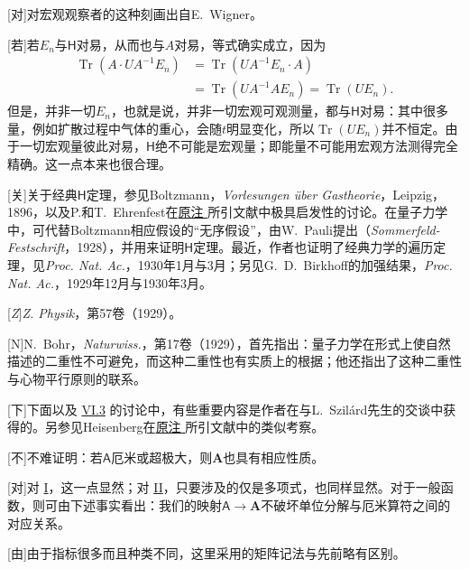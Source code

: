 \documentclass[fontsize=13pt,twoside,openany,headings=normal,parskip=false,bookmarkpackage=false,DIV=calc]{scrbook}
\begin{document}
[对]{对宏观观察者的这种刻画出自E.~Wigner。}

[若]{若$E_n$与$\mathsf H$对易，从而也与$A$对易，等式确实成立，因为
\begin{align*}
\operatorname{Tr}(A\cdot UA^{-1}E_n)
&=\operatorname{Tr}(UA^{-1}E_n\cdot A)\\
&=\operatorname{Tr}(UA^{-1}AE_n)=\operatorname{Tr}(UE_n).
\end{align*}
但是，并非一切$E_n$，也就是说，并非一切宏观可观测量，\hypertarget{origpage-262}{}\label{origpage-262}都与$\mathsf H$对易：其中很多量，例如扩散过程中气体的重心，会随$t$明显变化，所以$\operatorname{Tr}(UE_n)$并不恒定。由于一切宏观量彼此对易，$\mathsf H$绝不可能是宏观量；即能量不可能用宏观方法测得完全精确。这一点本来也很合理。}

[关]{关于经典$\mathsf H$定理，参见Boltzmann，\emph{Vorlesungen über Gastheorie}，Leipzig，1896，以及P.和T.~Ehrenfest在\CJKglue \hyperlink{note-185}{原注 } 所引文献中极具启发性的讨论。在量子力学中，可代替Boltzmann相应假设的“无序假设”，由W.~Pauli提出（\emph{Sommerfeld-Festschrift}，1928），并用来证明$\mathsf H$定理。最近，作者也证明了经典力学的遍历定理，见\emph{Proc. Nat. Ac.}，1930年1月与3月；另见G.~D.~Birkhoff的加强结果，\emph{Proc. Nat. Ac.}，1929年12月与1930年3月。}

[\emph{Z}]{\emph{Z. Physik}，第57卷（1929）。}

[N]{N.~Bohr，\emph{Naturwiss.}，第17卷（1929），首先指出：量子力学在形式上使自然描述的二重性不可避免，而这种二重性也有实质上的根据；他还指出了这种二重性与心物平行原则的联系。}

[下]{下面以及 \hyperref[sec:VI.3]{VI.3} 的讨论中，有些重要内容是作者在与L.~Szilárd先生的交谈中获得的。另参见Heisenberg在\CJKglue \hyperlink{note-181}{原注 } 所引文献中的类似考察。}

[不]{不难证明：若$\mathsf A$厄米或超极大，则$\boldsymbol A$也具有相应性质。}

[对]{对 \hyperref[cond:IV.2.I]{I}，这一点显然；对 \hyperref[cond:IV.2.II]{II}，只要涉及的仅是多项式，也同样显然。对于一般函数，则可由下述事实看出：我们的映射$\mathsf A\to\boldsymbol A$不破坏单位分解与厄米算符之间的对应关系。}

[由]{由于指标很多而且种类不同，这里采用的矩阵记法与先前略有区别。}
\end{document}
